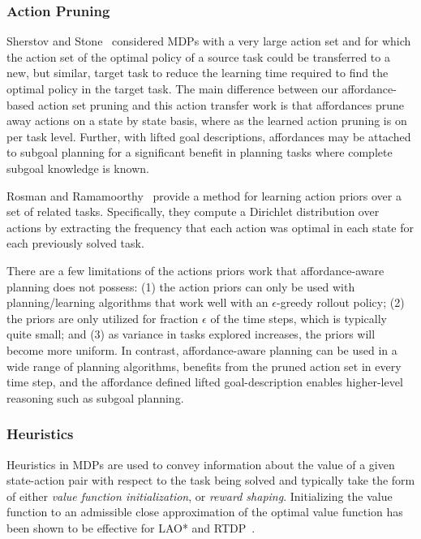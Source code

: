 \documentclass[conference]{IEEEtran}
\begin{document}
\subsubsection{Action Pruning}

Sherstov and Stone~\cite{sherstov2005improving} considered MDPs with a very large action set and for which the action
set of the optimal policy of a source task could be transferred to a new, but similar, target
task to reduce the learning time required to find the optimal policy in the target task. The main difference between our affordance-based action set pruning and this action transfer
work is that affordances prune away actions on a state by state basis, where
as the learned action pruning is on per task level. Further, with lifted goal descriptions, affordances may be attached to subgoal planning for a significant
benefit in planning tasks where complete subgoal knowledge is known.

Rosman and Ramamoorthy~\cite{rosman2012good} provide a method for learning action priors over a set of related tasks. Specifically, they compute a Dirichlet distribution over actions by extracting the frequency that each action was optimal in each state for each previously solved task.

There are a few limitations of the actions priors work that affordance-aware planning does not possess: (1) the action priors can only be used with planning/learning algorithms that work well with an $\epsilon$-greedy rollout policy; (2) the priors are only utilized for fraction $\epsilon$ of the time steps, which is typically quite small; and (3) as variance in tasks explored increases, the priors will become more uniform. In contrast, affordance-aware planning can be used in a wide range of planning algorithms, benefits from the pruned action set in every time step, and the affordance defined lifted goal-description enables higher-level reasoning such as subgoal planning.

\subsubsection{Heuristics}
Heuristics in MDPs are used to convey information about the value of a given state-action pair with respect to the task being solved and typically take the form of either {\em value function initialization},
or {\em reward shaping}. Initializing the value function to an admissible close approximation of the optimal value function has been shown to be effective for LAO* and RTDP~\cite{Hansen:1999qf}.
\end{document}
